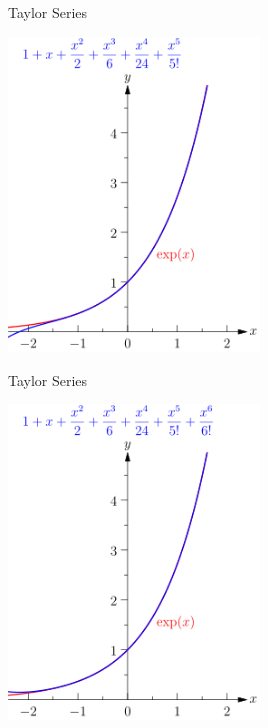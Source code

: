 \documentclass{beamer}
\begin{document}
\begin{frame}{Taylor Series}
      \begin{center}

    \includegraphics[width=0.5\textwidth, height=\textheight, keepaspectratio]{Mfnf-exp-series-imageonline.co-60931-7.png}
  \end{center}
    
\end{frame}


\begin{frame}{Taylor Series}
      \begin{center}

    \includegraphics[width=0.5\textwidth, height=\textheight, keepaspectratio]{Mfnf-exp-series-imageonline.co-60931-8.png}
  \end{center}
    
\end{frame}
\end{document}

